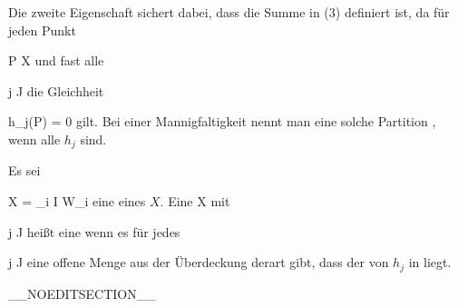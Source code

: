 Die zweite Eigenschaft sichert dabei, dass die Summe in (3) definiert ist, da für jeden Punkt

\mavergleichskette
{\vergleichskette
{ P
}
{ \in }{ X
}
{  }{
}
{    }{
}
{   }{
}
}
{}{}{}
und fast alle

\mavergleichskette
{\vergleichskette
{ j
}
{ \in }{ J
}
{  }{
}
{    }{
}
{   }{
}
}
{}{}{}
die Gleichheit

\mavergleichskette
{\vergleichskette
{  h_j(P)
}
{ = }{ 0
}
{  }{
}
{    }{
}
{   }{
}
}
{}{}{}
gilt. Bei einer Mannigfaltigkeit nennt man eine solche Partition  {,} wenn alle $h_j$
sind.

{}
{

Es sei

\mavergleichskette
{\vergleichskette
{ X
}
{ = }{ \bigcup_{i \in I} W_i
}
{  }{
}
{    }{
}
{   }{
}
}
{}{}{}
eine
eines
$X$. Eine
 { X } {\R
} {}
mit

\mavergleichskette
{\vergleichskette
{ j
}
{ \in }{ J
}
{  }{
}
{    }{
}
{   }{
}
}
{}{}{}
heißt eine  wenn es für jedes

\mavergleichskette
{\vergleichskette
{ j
}
{ \in }{ J
}
{  }{
}
{    }{
}
{   }{
}
}
{}{}{}
eine offene Menge
 aus der Überdeckung derart gibt, dass der
von $h_j$ in
 liegt.

}

__NOEDITSECTION__


